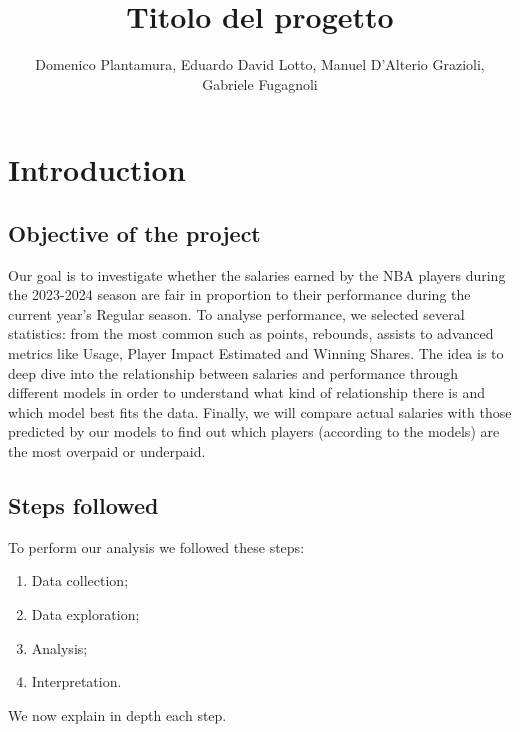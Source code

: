\documentclass[
]{article}
\title{Titolo del progetto}
\author{Domenico Plantamura, Eduardo David Lotto, Manuel D'Alterio
Grazioli, Gabriele Fugagnoli}
\date{}
\begin{document}
\maketitle

{
\setcounter{tocdepth}{2}
\tableofcontents
}
\hfill\break

\hypertarget{introduction}{%
\section{Introduction}\label{introduction}}

\hypertarget{objective-of-the-project}{%
\subsection{Objective of the project}\label{objective-of-the-project}}

Our goal is to investigate whether the salaries earned by the NBA
players during the 2023-2024 season are fair in proportion to their
performance during the current year's Regular season. To analyse
performance, we selected several statistics: from the most common such
as points, rebounds, assists to advanced metrics like Usage, Player
Impact Estimated and Winning Shares. The idea is to deep dive into the
relationship between salaries and performance through different models
in order to understand what kind of relationship there is and which
model best fits the data. Finally, we will compare actual salaries with
those predicted by our models to find out which players (according to
the models) are the most overpaid or underpaid.

\hypertarget{steps-followed}{%
\subsection{Steps followed}\label{steps-followed}}

To perform our analysis we followed these steps:

\begin{enumerate}
\def\labelenumi{\arabic{enumi}.}
\item
  Data collection;
\item
  Data exploration;
\item
  Analysis;
\item
  Interpretation.
\end{enumerate}

We now explain in depth each step.

\hfill\break
\end{document}
